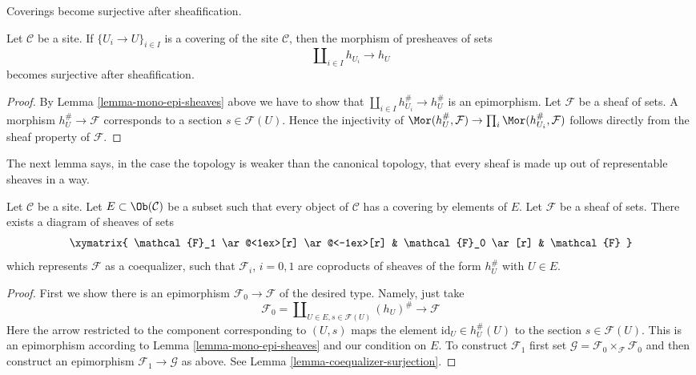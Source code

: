 \begin{lemma}
\label{lemma-covering-surjective-after-sheafification}
\begin{slogan}
Coverings become surjective after sheafification.
\end{slogan}
Let $\mathcal{C}$ be a site. If
$\{U_i \to U\}_{i \in I}$ is a covering of the site
$\mathcal{C}$, then the morphism of presheaves of sets
$$
\coprod\nolimits_{i \in I} h_{U_i} \to h_U
$$
becomes surjective after sheafification.
\end{lemma}

\begin{proof}
By Lemma \ref{lemma-mono-epi-sheaves} above we have to show that
$\coprod\nolimits_{i \in I} h_{U_i}^\# \to h_U^\#$
is an epimorphism. Let $\mathcal{F}$ be a sheaf of sets.
A morphism $h_U^\# \to \mathcal{F}$
corresponds to a section $s \in \mathcal{F}(U)$.
Hence the injectivity of $\Mor(h_U^\#, \mathcal{F})
\to \prod_i \Mor(h_{U_i}^\#, \mathcal{F})$ follows
directly from the sheaf property of $\mathcal{F}$.
\end{proof}

\noindent
The next lemma says, in the case the topology is weaker than the
canonical topology, that every sheaf is made up out of
representable sheaves in a way.

\begin{lemma}
\label{lemma-sheaf-coequalizer-representable}
Let $\mathcal{C}$ be a site. Let $E \subset \Ob(\mathcal{C})$ be a
subset such that every object of $\mathcal{C}$ has a covering by
elements of $E$. Let $\mathcal{F}$ be a sheaf of sets. There exists a
diagram of sheaves of sets
$$
\xymatrix{
\mathcal{F}_1 \ar@<1ex>[r] \ar@<-1ex>[r] &
\mathcal{F}_0 \ar[r] &
\mathcal{F}
}
$$
which represents $\mathcal{F}$ as a coequalizer,
such that $\mathcal{F}_i$, $i = 0, 1$ are coproducts
of sheaves of the form $h_U^\#$ with $U \in E$.
\end{lemma}

\begin{proof}
First we show there is an epimorphism $\mathcal{F}_0 \to \mathcal{F}$
of the desired type. Namely, just take
$$
\mathcal{F}_0 =
\coprod\nolimits_{U \in E, s \in \mathcal{F}(U)}
(h_U)^\# \longrightarrow \mathcal{F}
$$
Here the arrow restricted to the component corresponding to $(U, s)$ maps
the element $\text{id}_U \in h_U^\#(U)$ to the section $s \in \mathcal{F}(U)$.
This is an epimorphism according to Lemma \ref{lemma-mono-epi-sheaves} and
our condition on $E$. To construct $\mathcal{F}_1$ first set
$\mathcal{G} = \mathcal{F}_0 \times_\mathcal{F} \mathcal{F}_0$ and
then construct an epimorphism $\mathcal{F}_1 \to \mathcal{G}$
as above. See Lemma \ref{lemma-coequalizer-surjection}.
\end{proof}

